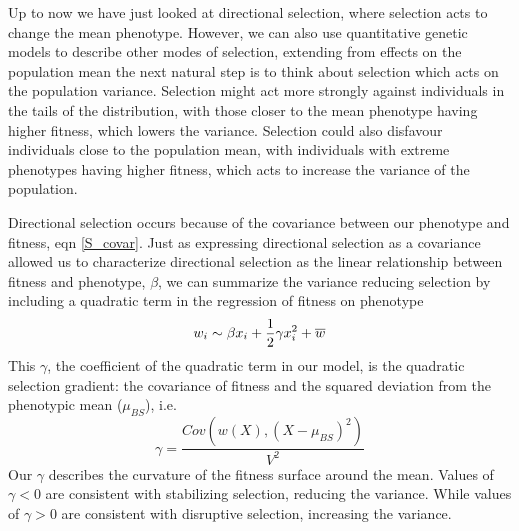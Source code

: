 Up to now we have just looked at directional selection, where
selection acts to change the mean phenotype. However, we
can also use quantitative genetic models to describe other modes of
selection, extending from effects on the population mean the next
natural step is to think about selection which acts on the
population variance. Selection might act more strongly against
individuals in the tails of the distribution, with those closer
to the mean phenotype having higher fitness, which lowers the
variance. Selection could also disfavour individuals close to the
population mean, with individuals with extreme phenotypes having
higher fitness, which acts to increase the variance of the population. 

Directional selection occurs because of the covariance
between our phenotype and fitness, eqn \eqref{S_covar}. Just as expressing directional selection as a covariance allowed us to
characterize directional selection as the linear relationship between
fitness and phenotype, $\beta$, we can summarize the variance
reducing selection by including a quadratic term in the regression of
fitness on phenotype
\begin{equation}
w_i \sim \beta x_i + \frac{1}{2}  \gamma x_i^2  + \overline{w} \label{fitness_regression_stab}
\end{equation}
This $\gamma$, the coefficient of the quadratic term in our model, is the
quadratic selection gradient: the covariance of fitness and the squared
deviation from the phenotypic mean ($\mu_{BS}$), i.e.
\begin{equation}
\gamma = \frac{Cov\left(w(X), (X-\mu_{BS})^2 \right)}{V^2}
\end{equation}
Our $\gamma$ describes the curvature of the fitness surface around the
mean. 
Values of $\gamma<0$  are consistent with stabilizing selection,
reducing the variance. While values of $\gamma>0$ are consistent with disruptive
selection, increasing the variance. 

